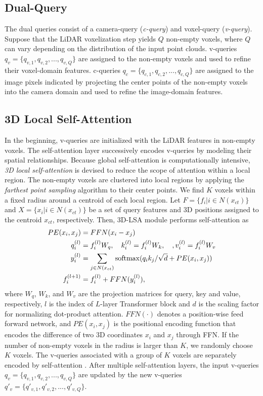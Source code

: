 \documentclass[lettersize,journal]{IEEEtran}
\begin{document}
\subsection{Dual-Query}
The dual queries consist of a camera-query ({\it c-query}) and  voxel-query ({\it v-query}).
Suppose that the LiDAR voxelization step yields $Q$ non-empty voxels, where $Q$ can vary depending on the distribution of the input point clouds.  v-queries $q_v = \{q_{v,1},q_{v,2},..., q_{v,Q}\}$ are assigned to the non-empty voxels and used to refine their voxel-domain features.  c-queries $q_c = \{q_{c,1},q_{c,2},..., q_{c,Q}\}$ are assigned to  the image pixels indicated by projecting the center points of the non-empty voxels into the camera domain and used to refine the image-domain features.  





\subsection{3D Local Self-Attention}
In the beginning, v-queries are initialized with the LiDAR features in non-empty voxels. The self-attention layer successively encodes v-queries by modeling their spatial relationships. Because global self-attention is computationally intensive,  {\it 3D local self-attention} is devised to reduce the scope of attention within a local region. The non-empty voxels are clustered into local regions by applying the {\it farthest point sampling} algorithm \cite{pointnet++} to their center points. We find $K$ voxels within a fixed radius around a centroid of each local region. Let $F=\{f_i|i\in{N(x_{ct})}\}$ and $X=\{x_i|i\in{N(x_{ct})}\}$ be a set of query features and 3D positions assigned to the centroid $x_{ct}$, respectively. Then, 3D-LSA module performs self-attention as
\begin{align}
PE(x_i, x_j) &= FFN(x_i - x_j)  \nonumber \\
q_i^{(l)}&={f_i^{(l)}}{W_q}, \quad k_i^{(l)} = {f_i^{(l)}}{W_k}, \quad, v_i^{(l)}={f_i^{(l)}}{W_v} \nonumber \\
y_i^{(l)} &= \sum_{j\in N(x_{ct})}{\rm softmax}({q_i}{k_j} / \sqrt{d} + PE(x_i, x_j)) \nonumber  \\
f_{i}^{(l+1)} &= f_i^{(l)} + FFN(y_i^{(l)}), 
\end{align}
where $W_q$, $W_k$, and $W_v$ are the projection matrices for query, key and value, respectively, $l$ is the index of $L$-layer Transformer block and $d$ is the scaling factor for normalizing dot-product attention. $FFN(\cdot)$ denotes a position-wise feed forward network, and $PE(x_i, x_j)$ is the positional encoding function that encodes the difference of two 3D coordinates  $x_i$ and $x_j$ through FFN. 
 If the number of non-empty voxels in the radius is larger than $K$, we randomly choose $K$ voxels. The v-queries associated with a group of $K$ voxels are separately encoded by self-attention \cite{transformer}. 
After multiple self-attention layers, the input v-queries $q_{v} = \{q_{v,1},q_{v,2},..., q_{v,Q}\}$ are updated by the new v-queries $q'_{v} =  \{q'_{v,1},q'_{v,2},..., q'_{v,Q}\}$.
\end{document}

